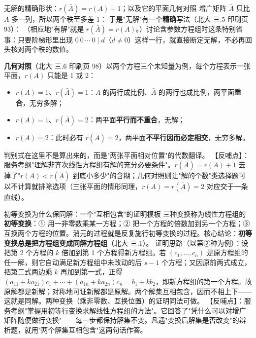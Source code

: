 \begin{fdeep}{无解的精确形状：$r(\bar A)=r(A)+1$；以及它的平面几何对照}
增广矩阵 $\bar A$ 只比 $A$ 多一列，所以两个秩至多差 1：
于是"无解"有一个\textbf{精确}写法（北大 三.5 印刷页 93）：
（相应地"有解"就是 $r(\bar A)=r(A)$。）讨论含参数方程组时这条特别省事：只要阶梯形里出现 $0\ 0\ \cdots\ 0\mid d$（$d\ne0$）这样一行，就直接断定无解，不必再回头核对两个秩的数值。

\textbf{几何对照}（北大 三.6 印刷页 98）以两个方程三个未知量为例，每个方程表示一张平面，$r(A)$ 只能是 1 或 2：
\begin{itemize}[leftmargin=2.2em,itemsep=0.25em]
\item $r(A)=1$、$r(\bar A)=1$：$A$ 的两行成比例、$\bar A$ 的两行也成比例，两平面\textbf{重合}，无穷多解；
\item $r(A)=1$、$r(\bar A)=2$：两平面\textbf{平行而不重合}，无解；
\item $r(A)=2$：此时必有 $r(\bar A)=2$，两平面\textbf{不平行因而必定相交}，无穷多解。
\end{itemize}
判别式在这里不是算出来的，而是"两张平面相对位置"的代数翻译。
【反哺点】：服务考纲"理解非齐次线性方程组有解的充分必要条件"。$r(\bar A)=r(A)+1$ 去掉了"$r(A)<r(\bar A)$ 到底小多少"的含糊；几何对照则让"解的个数"类选择题可以不计算就排除选项（三张平面的情形同理，$r(A)=r(\bar A)=2$ 对应交于一条直线）。
\end{fdeep}

\begin{fdeep}{初等变换为什么保同解：一个"互相包含"的证明模板}
三种变换称为线性方程组的\textbf{初等变换}：① 用一非零数乘某一方程；② 把一个方程的倍数加到另一个方程；③ 互换两个方程的位置。消元的过程就是反复施行初等变换的过程。核心结论：\textbf{初等变换总是把方程组变成同解方程组}（北大 三.1）。
证明思路（以第②种为例）：设把第 2 个方程的 $k$ 倍加到第 1 个方程得新方程组。若 $(c_1,\dots,c_n)$ 是原方程组的任一解，则它自动满足新方程组中未改动的后 $s-1$ 个方程；又因原前两式成立，
把第二式两边乘 $k$ 再加到第一式，正得 $(a_{11}+ka_{21})c_1+\cdots+(a_{1n}+ka_{2n})c_n=b_1+kb_2$，即新方程组的第一个方程。故原解都是新解；对称地可证新解都是原解。两个解集互相包含，因而不相上下——这就是同解。两种变换（乘非零数、互换位置）的证明同法可做。
【反哺点】：服务考纲"掌握用初等行变换求解线性方程组的方法"。它回答了"凭什么可以对增广矩阵随便做行变换"——每一步都保持解集不变。凡遇"变换后解集是否改变"的辨析题，就用"两个解集互相包含"这两句话作答。
\end{fdeep}

